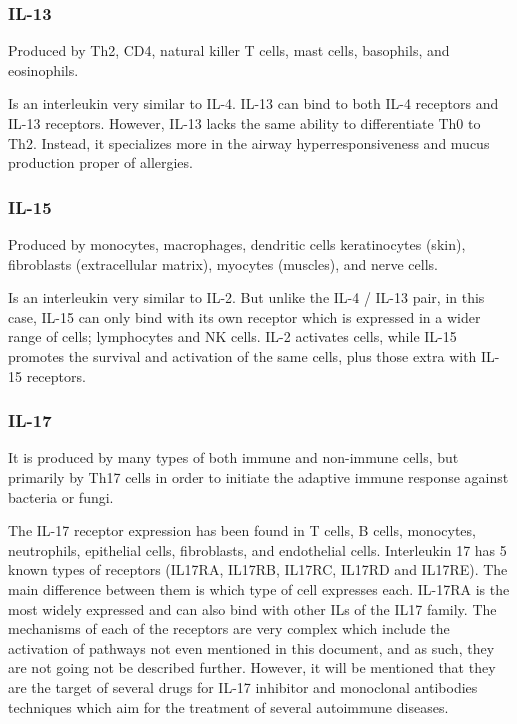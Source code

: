 \subsubsection{IL-13}
\label{in:IL13}

Produced by Th2, CD4, natural killer T cells, mast cells, basophils, and eosinophils.

Is an interleukin very similar to IL-4. IL-13 can bind to both IL-4 receptors and IL-13 receptors. However, IL-13 lacks the same ability to differentiate Th0 to Th2. Instead, it specializes more in the airway hyperresponsiveness and mucus production proper of allergies.

\subsubsection{IL-15}
\label{in:IL15}

Produced by monocytes, macrophages, dendritic cells keratinocytes (skin), fibroblasts (extracellular matrix), myocytes (muscles), and nerve cells.

Is an interleukin very similar to IL-2. But unlike the IL-4 / IL-13 pair, in this case, IL-15 can only bind with its own receptor which is expressed in a wider range of cells; lymphocytes and NK cells. IL-2 activates cells, while IL-15 promotes the survival and activation of the same cells, plus those extra with IL-15 receptors.

\subsubsection{IL-17}
\label{in:IL17}

It is produced by many types of both immune and non-immune cells, but primarily by Th17 cells in order to initiate the adaptive immune response against bacteria or fungi.

The IL-17 receptor expression has been found in T cells, B cells, monocytes, neutrophils, epithelial cells, fibroblasts, and endothelial cells. Interleukin 17 has 5 known types of receptors (IL17RA, IL17RB, IL17RC, IL17RD and IL17RE). The main difference between them is which type of cell expresses each. IL-17RA is the most widely expressed and can also bind with other ILs of the IL17 family. The mechanisms of each of the receptors are very complex which include the activation of pathways not even mentioned in this document, and as such, they are not going not be described further. However, it will be mentioned that they are the target of several drugs for IL-17 inhibitor and monoclonal antibodies techniques which aim for the treatment of several autoimmune diseases.

